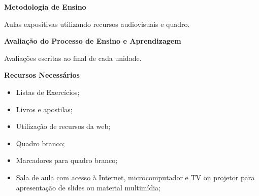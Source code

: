  
 
 
 

\begin{snugshade}\begin{center}\textbf{
    Metodologia de Ensino
}\end{center}\end{snugshade}

\noindent
  Aulas expositivas utilizando recursos audiovisuais e quadro.

\begin{snugshade}\begin{center}\textbf{
    Avaliação do Processo de Ensino e Aprendizagem
}\end{center}\end{snugshade}

\noindent
   Avaliações escritas ao final de cada unidade.
   
\begin{snugshade}\begin{center}\textbf{
    Recursos Necessários
    \vphantom{q} %
}\end{center}\end{snugshade}

\begin{itemize} 
   \item Listas de Exercícios;
   \item Livros e apostilas;
   \item Utilização de recursos da web;
   \item Quadro branco;
   \item Marcadores para quadro branco;
   \item Sala de aula com acesso à Internet, microcomputador e TV ou projetor para apresentação de slides ou material multimídia;
\end{itemize}

